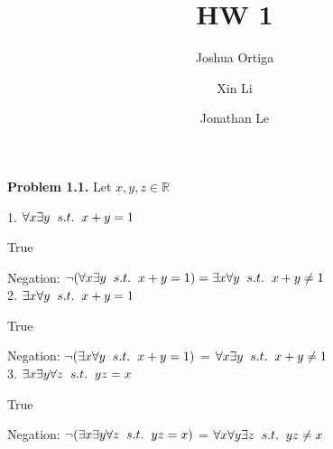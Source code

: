 \documentclass{article}
\title{HW 1}
\author{Joshua Ortiga \\
		\and
		Xin Li \\
		\and
		Jonathan Le}
\begin{document}
\maketitle

\textbf{Problem 1.1.} \hspace{0.2cm} Let $x, y, z \in \mathbb{R}$ \\

\hspace*{1cm}
\begin{minipage}{.8\textwidth} 
	\hfill

	1. $\forall x \exists y \hspace{0.2cm} s.t. \hspace{0.2cm} x + y = 1$

	True

	Negation: 
	$\neg (\forall x \exists y \hspace{0.2cm} s.t. \hspace{0.2cm} x + y = 1) 
	= \exists x \forall y\hspace{0.2cm} s.t. \hspace{0.2cm} x + y \neq 1$ \\

	2. $\exists x \forall y \hspace{0.2cm} s.t. \hspace{0.2cm} x + y = 1$

	True 

	Negation: 
	$\neg (\exists x \forall y \hspace{0.2cm} s.t. \hspace{0.2cm} x + y = 1)$
	= $\forall x \exists y \hspace{0.2cm} s.t. \hspace{0.2cm} x + y \neq 1$ \\

	3. $\exists x \exists y \forall z \hspace{0.2cm} s.t. \hspace{0.2cm} yz = x$

	True 

	Negation: 
	$\neg (\exists x \exists y \forall z \hspace{0.2cm} s.t. \hspace{0.2cm} yz = x)$ = 
	$\forall x \forall y \exists z \hspace{0.2cm} s.t. \hspace{0.2cm} yz \neq x$\\

\end{minipage} \\ \\ \\ \\
\end{document}
